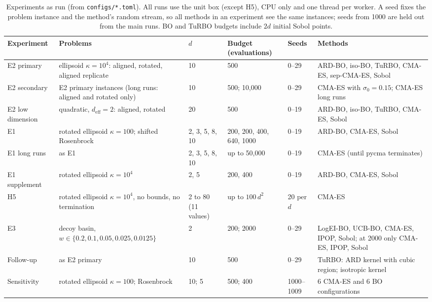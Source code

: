 \documentclass[10pt,a4paper,twocolumn]{article}
\begin{document}
\begin{table}[t]\centering\footnotesize\setlength{\tabcolsep}{3pt}
\begin{tabular}{@{}p{}p{}p{}p{}p{}p{}@{}}
\toprule
Experiment & Problems & $d$ & Budget (evaluations) & Seeds & Methods \\
\midrule
E2 primary & ellipsoid $\kappa=10^4$: aligned, rotated, aligned replicate & 10 & 500 & 0--29 & ARD-BO, iso-BO, TuRBO, CMA-ES, sep-CMA-ES, Sobol \\
E2 secondary & E2 primary instances (long runs: aligned and rotated only) & 10 & 500; 10{,}000 & 0--29 & CMA-ES with $\sigma_0=0.15$; CMA-ES long runs \\
E2 low dimension & quadratic, $d_{\mathrm{eff}}=2$: aligned, rotated & 20 & 500 & 0--19 & ARD-BO, iso-BO, TuRBO, CMA-ES, Sobol \\
E1 & rotated ellipsoid $\kappa=100$; shifted Rosenbrock & 2, 3, 5, 8, 10 & 200, 200, 400, 640, 1000 & 0--19 & ARD-BO, CMA-ES, Sobol \\
E1 long runs & as E1 & 2, 3, 5, 8, 10 & up to 50{,}000 & 0--19 & CMA-ES (until pycma terminates) \\
E1 supplement & rotated ellipsoid $\kappa=10^4$ & 2, 5 & 200, 400 & 0--19 & ARD-BO, CMA-ES, Sobol \\
H5 & rotated ellipsoid $\kappa=10^4$, no bounds, no termination & 2 to 80 (11 values) & up to $100\,d^2$ & 20 per $d$ & CMA-ES \\
E3 & decoy basin, $w\in\{0.2,0.1,0.05,0.025,0.0125\}$ & 2 & 200; 2000 & 0--29 & LogEI-BO, UCB-BO, CMA-ES, IPOP, Sobol; at 2000 only CMA-ES, IPOP, Sobol \\
Follow-up & as E2 primary & 10 & 500 & 0--29 & TuRBO: ARD kernel with cubic region; isotropic kernel \\
Sensitivity & rotated ellipsoid $\kappa=100$; Rosenbrock & 10; 5 & 500; 400 & 1000--1009 & 6 CMA-ES and 6 BO configurations \\
\bottomrule
\end{tabular}
\caption{Experiments as run (from \texttt{configs/*.toml}). All runs use the unit box (except H5), CPU only and one
thread per worker. A seed fixes the problem instance and the method's random stream, so all methods in an experiment see
the same instances; seeds from 1000 are held out from the main runs. BO and TuRBO budgets include $2d$ initial Sobol
points.}
\label{tab:design}
\end{table}
\end{document}
